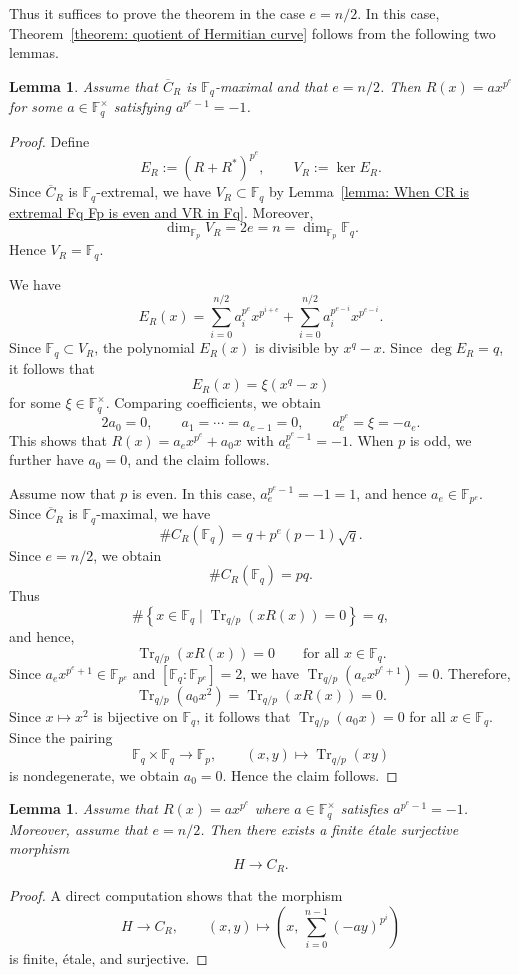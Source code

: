 \documentclass[12pt,a4paper]{amsart}
\newtheorem{lemma}[theorem]{Lemma}
\theoremstyle{definition}
\def\F{{\mathbb F}}
\theoremstyle{remark}
\DeclareMathOperator{\Tr}{Tr}
\begin{document}
Thus it suffices to prove the theorem in the case $e=n/2$.
In this case, Theorem~\ref{theorem: quotient of Hermitian curve}
follows from the following two lemmas. 

\begin{lemma}\label{app1}
Assume that $\overline{C}_R$ is $\F_q$-maximal and that  
$e=n/2$. Then $R(x)=ax^{p^e}$ for some $a\in\F_q^\times$
satisfying $a^{p^e-1}=-1$. 
\end{lemma}
\begin{proof}

Define 
\[
E_R:=(R+R^\ast)^{p^e},\qquad V_R:=\ker E_R. 
\]
Since $\overline{C}_R$ is $\F_q$-extremal, we have 
$V_R \subset \F_q$ by Lemma~\ref{lemma: When CR is extremal Fq Fp is even and VR in Fq}. 
Moreover,
\[
\dim_{\F_p}V_R=2e=n=\dim_{\F_p}\F_q.
\]
Hence $V_R=\F_q$.

We have 
\[
E_R(x)=\sum_{i=0}^{n/2} a_i^{p^e}x^{p^{i+e}}+\sum_{i=0}^{n/2}
a_i^{p^{e-i}}x^{p^{e-i}}. 
\]
 Since $\F_q\subset V_R$, the polynomial $E_R(x)$ is divisible by $x^q-x$. Since $\deg E_R=q$, it follows that
\[
E_R(x)=\xi(x^q-x)
\]
for some $\xi\in\F_q^\times$.
 Comparing coefficients, we obtain 
\[
2a_0=0, \qquad 
a_1=\cdots=a_{e-1}=0, \qquad 
a_{e}^{p^e}=\xi=-a_e. 
\]
This shows that $R(x)=a_e x^{p^e}+a_0 x$ with $a_e^{p^e-1}=-1$. When $p$ is odd, we further have $a_0=0$, and the claim follows.  

Assume now that $p$ is even. In this case, $a_e^{p^e-1}=-1=1$, and hence $a_e\in\F_{p^e}$. 
Since $\overline{C}_R$ is $\F_q$-maximal, we have 
\[
\# C_R(\F_q)=q+p^e(p-1)\sqrt{q}. 
\]
Since $e=n/2$, we obtain 
\[
\# C_R(\F_q)=pq. 
\]
Thus
\[
\#\left\{x\in \F_q\mid\Tr_{q/p}(xR(x))=0\right\}=q, 
\]
and hence, 
\[
\Tr_{q/p}(xR(x))=0
\qquad\text{for all }x\in\F_q.
\]
Since $a_e x^{p^e+1} \in \F_{p^e}$ and $[\F_q:\F_{p^e}]=2$, we have 
$\Tr_{q/p}(a_ex^{p^e+1})=0$. Therefore, 
\[\Tr_{q/p}(a_0 x^2)=\Tr_{q/p}(x R(x))=0. \]
Since $x\mapsto x^2$ is bijective on $\F_q$, it follows that $\Tr_{q/p}(a_0 x)=0$ for all $x\in \F_q$. 
Since the pairing
\[
\F_q\times\F_q\to\F_p,\qquad (x,y)\mapsto\Tr_{q/p}(xy)
\]
is nondegenerate, we obtain $a_0=0$.  Hence the claim follows. 
\end{proof}
\begin{lemma}\label{app2}
Assume that $R(x)=ax^{p^e}$ where $a\in \F_q^\times$ satisfies $a^{p^e-1}=-1$. Moreover, assume that $e=n/2$. Then there exists a finite \'etale surjective morphism 
\[
H\to C_R. 
\]
\end{lemma}
\begin{proof}
A direct computation shows that the morphism
\[
H \longrightarrow C_R,
\qquad
(x,y)\longmapsto
\left(
x,\,
\sum_{i=0}^{n-1}(-ay)^{p^i}
\right)
\]
is finite, \'etale, and surjective.
\end{proof}
\end{document}
